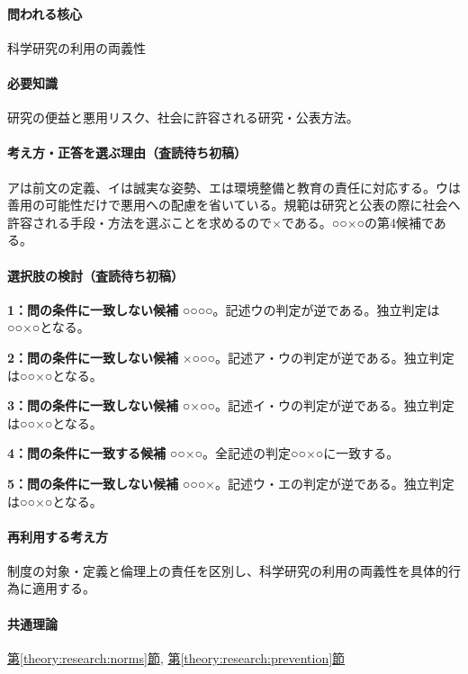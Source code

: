 \paragraph{問われる核心} 科学研究の利用の両義性

\paragraph{必要知識} 研究の便益と悪用リスク、社会に許容される研究・公表方法。

\paragraph{考え方・正答を選ぶ理由（査読待ち初稿）} アは前文の定義、イは誠実な姿勢、エは環境整備と教育の責任に対応する。ウは善用の可能性だけで悪用への配慮を省いている。規範は研究と公表の際に社会へ許容される手段・方法を選ぶことを求めるので×である。○○×○の第4候補である。

\paragraph{選択肢の検討（査読待ち初稿）}\mbox{}\par

\noindent\textbf{1：問の条件に一致しない候補} ○○○○。記述ウの判定が逆である。独立判定は○○×○となる。\par

\noindent\textbf{2：問の条件に一致しない候補} ×○○○。記述ア・ウの判定が逆である。独立判定は○○×○となる。\par

\noindent\textbf{3：問の条件に一致しない候補} ○×○○。記述イ・ウの判定が逆である。独立判定は○○×○となる。\par

\noindent\textbf{4：問の条件に一致する候補} ○○×○。全記述の判定○○×○に一致する。\par

\noindent\textbf{5：問の条件に一致しない候補} ○○○×。記述ウ・エの判定が逆である。独立判定は○○×○となる。\par

\paragraph{再利用する考え方} 制度の対象・定義と倫理上の責任を区別し、科学研究の利用の両義性を具体的行為に適用する。

\paragraph{共通理論} \hyperref[theory:research:norms]{第\ref*{theory:research:norms}節}, \hyperref[theory:research:prevention]{第\ref*{theory:research:prevention}節}

